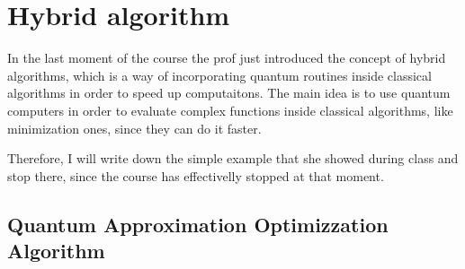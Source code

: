 \section{Hybrid algorithm}

In the last moment of the course the prof just introduced the concept of hybrid algorithms, which is a way of incorporating quantum routines inside classical algorithms in order to speed up computaitons. The main idea is to use quantum computers in order to evaluate complex functions inside classical algorithms, like minimization ones, since they can do it faster.

Therefore, I will write down the simple example that she showed during class and stop there, since the course has effectivelly stopped at that moment.

\subsection{Quantum Approximation Optimizzation Algorithm}

